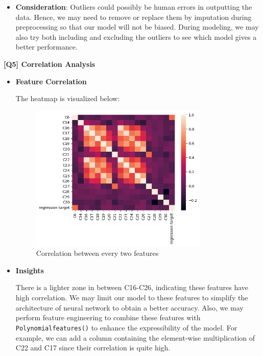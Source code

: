 \documentclass{article}
\begin{document}
\begin{description}
\begin{itemize}
			\item \textbf{Consideration}: Outliers could possibly be human errors in outputting the data. Hence, we may need to remove or replace them by imputation during preprocessing so that our model will not be biased. During modeling, we may also try both including and excluding the outliers to see which model gives a better performance.
		\end{itemize}

	\item \textbf{[Q5] Correlation Analysis}
		\begin{itemize}
			\item \textbf{Feature Correlation} 

				The heatmap is visualized below:

				\begin{figure}[H]
					\centering
					\includegraphics[width=0.8\textwidth]{figures/q5_heatmap.png}
					\caption{Correlation between every two features}
					\label{q5}
				\end{figure}
				
			\item \textbf{Insights}

				There is a lighter zone in between C16-C26, indicating these features have high correlation. We may limit our model to these features to simplify the architecture of neural network to obtain a better accuracy. Also, we may perform feature engineering to combine these features with \texttt{Polynomialfeatures()} to enhance the expressibility of the model. For example, we can add a column containing the element-wise multiplication of C22 and C17 since their correlation is quite high.
		\end{itemize}


\end{description}
\end{document}

